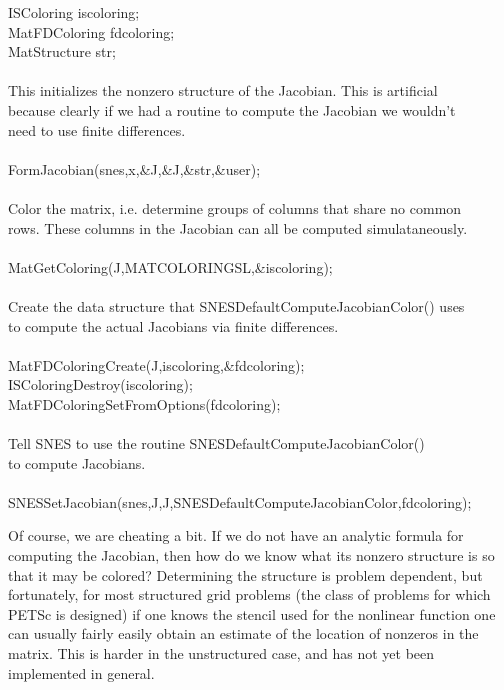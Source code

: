\begin{tabbing}
   ISColoring    iscoloring;\\
   MatFDColoring fdcoloring;\\
   MatStructure  str;\\

   \trl{/*}\\
      This initializes the nonzero structure of the Jacobian. This is artificial\\
      because clearly if we had a routine to compute the Jacobian we wouldn't\\
      need to use finite differences.\\
   \trl{*/}\\
   FormJacobian(snes,x,\&J,\&J,\&str,\&user);\\

   \trl{/*}\\
       Color the matrix, i.e. determine groups of columns that share no common \\
      rows. These columns in the Jacobian can all be computed simulataneously.\\
   \trl{*/}\\
   MatGetColoring(J,MATCOLORINGSL,\&iscoloring);\\

   \trl{/*}\\
       Create the data structure that SNESDefaultComputeJacobianColor() uses\\
       to compute the actual Jacobians via finite differences.\\
   \trl{*/}\\
   MatFDColoringCreate(J,iscoloring,\&fdcoloring);\\
   ISColoringDestroy(iscoloring);\\
   MatFDColoringSetFromOptions(fdcoloring);\\

   \trl{/*}\\
      Tell SNES to use the routine SNESDefaultComputeJacobianColor()\\
      to compute Jacobians.\\
   \trl{*/}\\
   SNESSetJacobian(snes,J,J,SNESDefaultComputeJacobianColor,fdcoloring);\\

\end{tabbing}

Of course, we are cheating a bit. If we do not have an analytic
formula for computing the Jacobian, then how do we know what its
nonzero structure is so that it may be colored?  Determining the
structure is problem dependent, but fortunately, for most structured grid
problems (the class of problems for which PETSc is designed) if one
knows the stencil used for the nonlinear function one can usually
fairly easily obtain an estimate of the location of nonzeros in
the matrix. This is harder in the unstructured case, and has not yet
been implemented in general.

